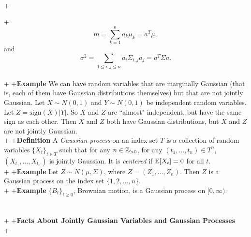+\documentclass{article}
\begin{document}
+\[m=\sum_{k=1}^n a_k\mu_k=a^T\mu,\] and \[\sigma^2=\sum_{1\leq i,j\leq n} a_i\Sigma_{i,j}a_j=a^T\Sigma a.\]\\
+
+\textbf{Example} We can have random variables that are marginally Gaussian (that is, each of them have Gaussian distributions themselves) but that are not jointly Gaussian.  Let $X\sim N(0,1)$ and $Y\sim N(0,1)$ be independent random variables.  Let $Z=\mathrm{sign}(X)|Y|$.  So $X$ and $Z$ are ``almost" independent, but have the same sign as each other.  Then $X$ and $Z$ both have Gaussian distributions, but $X$ and $Z$ are not jointly Gaussian.\\
+
+\textbf{Definition} A \emph{Gaussian process} on an index set $T$ is a collection of random variables $\{X_t\}_{t\in T}$ such that for any $n\in\mathbb{Z}_{>0}$, for any $(t_1,\dots,t_n)\in T^n$, $(X_{t_1},\dots,X_{t_n})$ is jointly Gaussian.  It is \emph{centered} if $\mathbb{E}[X_t]=0$ for all $t$.\\
+
+\textbf{Example} Let $Z\sim N(\mu, \Sigma)$, where $Z=(Z_1,\dots,Z_n)$.  Then $Z$ is a Gaussian process on the index set $\{1,2,\dots,n\}$.\\
+
+\textbf{Example} $\{B_t\}_{t\geq 0}$, Brownian motion, is a Gaussian process on $[0,\infty)$.\\\\\\
+
+\textbf{\Large Facts About Jointly Gaussian Variables and Gaussian Processes}\\
+
\end{document}
